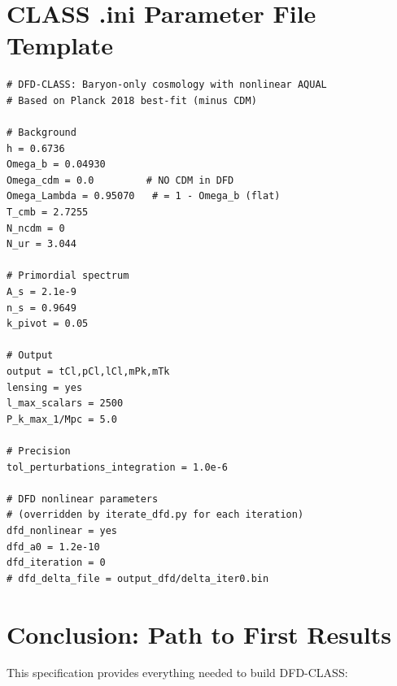 \documentclass[11pt]{article}
\theoremstyle{definition}
\theoremstyle{remark}
\begin{document}
\section{CLASS .ini Parameter File Template}
\label{sec:ini}

\begin{lstlisting}[language={},numbers=none,
  caption={dfd\_base.ini --- Template parameter file}]
# DFD-CLASS: Baryon-only cosmology with nonlinear AQUAL
# Based on Planck 2018 best-fit (minus CDM)

# Background
h = 0.6736
Omega_b = 0.04930
Omega_cdm = 0.0         # NO CDM in DFD
Omega_Lambda = 0.95070   # = 1 - Omega_b (flat)
T_cmb = 2.7255
N_ncdm = 0
N_ur = 3.044

# Primordial spectrum
A_s = 2.1e-9
n_s = 0.9649
k_pivot = 0.05

# Output
output = tCl,pCl,lCl,mPk,mTk
lensing = yes
l_max_scalars = 2500
P_k_max_1/Mpc = 5.0

# Precision
tol_perturbations_integration = 1.0e-6

# DFD nonlinear parameters
# (overridden by iterate_dfd.py for each iteration)
dfd_nonlinear = yes
dfd_a0 = 1.2e-10
dfd_iteration = 0
# dfd_delta_file = output_dfd/delta_iter0.bin
\end{lstlisting}


\section{Conclusion: Path to First Results}
\label{sec:conclusion}

This specification provides everything needed to build DFD-CLASS:
\end{document}

